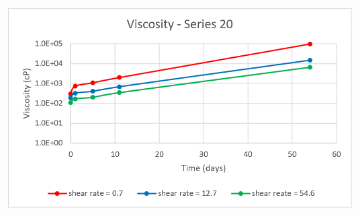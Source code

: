 \begin{appendices}
\begin{figure}
{\begin{subfigure}[b]{0.6\textwidth}
     \end{subfigure}
     \begin{subfigure}[b]{0.6\textwidth}
         \centering
         \includegraphics[width=\textwidth]{img/visc/20.png}
     \end{subfigure}
    }\\
\end{figure}
\end{appendices}

